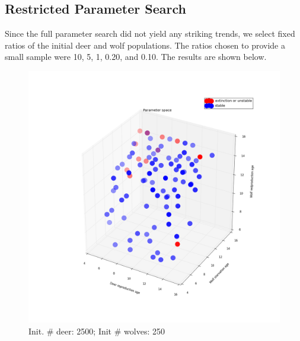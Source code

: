 \documentclass[a4paper,12pt]{article}
\begin{document}
\subsection{Restricted Parameter Search}
\indent
\indent Since the full parameter search did not yield any striking trends, we select fixed ratios of the initial deer and wolf populations.  The ratios chosen to provide 
a small sample were 10, 5, 1, 0.20, and 0.10. The results are shown below.

  \begin{figure}[ht]
  \centering
                \begin{minipage}[b]{.45\linewidth}
                        \includegraphics[width = 1\linewidth]{./pics/Restricted_Parameter_space_d2500_w250.png}
                    \caption{Init. $\#$ deer: 2500; Init $\#$ wolves: 250}
                \end{minipage}
                \quad
                \begin{minipage}[b]{.45\linewidth}

\end{minipage}
\end{figure}
\end{document}
